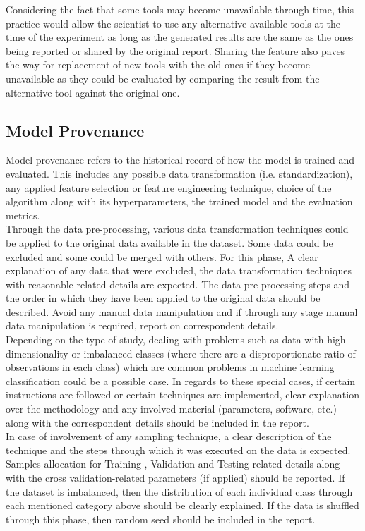     Considering the fact that some tools may become unavailable through time, this practice would allow the scientist to use 
    any alternative available tools at the time of the experiment as long as the generated results are the same as the ones being reported 
    or shared by the original report. Sharing the feature also paves the way for replacement of new tools with the old ones if they become 
    unavailable as they could be evaluated by comparing the result from the alternative tool against the original one.

    
    \subsection{Model Provenance}
    Model provenance refers to the historical record of how the model is trained and evaluated. This includes any possible 
    data transformation (i.e. standardization), any applied feature selection or feature engineering technique, choice of 
    the algorithm along with its hyperparameters, the trained model and the evaluation metrics.\\

    Through the data pre-processing, various data transformation techniques could be applied to the original data available in the 
    dataset. Some data could be excluded and some could be merged with others. For this phase, A clear explanation of any data 
    that were excluded, the data transformation techniques with reasonable related details are expected. The data pre-processing steps 
    and the order in which they have been applied to the original data should be described. Avoid any manual data manipulation and 
    if through any stage manual data manipulation is required, report on correspondent details.\\ 

    
    Depending on the type of study, dealing with problems such as data with high dimensionality or imbalanced classes 
    (where there are a disproportionate ratio of observations in each class) which are common problems in machine learning classification 
    could be a possible case. In regards to these special cases, if certain instructions are followed or certain techniques are implemented, 
    clear explanation over the methodology and any involved material 
    (parameters, software, etc.) along with the correspondent details should be included in the report.\\

    In case of involvement of any sampling technique, a clear description of the technique and the steps through which it was executed 
    on the data is expected. Samples allocation for Training , Validation and Testing related details along with the cross validation-related 
    parameters (if applied) should be reported. If the dataset is imbalanced, then the distribution of each 
    individual class through each mentioned category above should be clearly explained. 
    If the data is shuffled through this phase, then random seed should 
    be included in the report.\\


